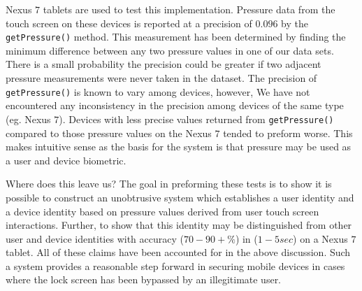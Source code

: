 Nexus $7$ tablets are used to test this implementation.
Pressure data from the touch screen on these devices is 
reported at a precision of $0.096$ by the {\tt getPressure()} method.
This measurement has been determined
by finding the minimum difference between
any two pressure values in one of our data sets.
%
There is a small probability the precision could
be greater if two adjacent pressure measurements
were never taken in the dataset.
%
The precision of {\tt getPressure()} is
known to vary among devices, however,
We have not encountered any inconsistency
in the precision among devices of the same type (eg. Nexus $7$).
%
Devices with less precise values returned from
{\tt getPressure()}
compared to those pressure values on the Nexus $7$
tended to preform worse.
%
This makes intuitive sense as the basis for the system
is that pressure may be used as a user and device biometric.

Where does this leave us?
The goal in preforming these tests is to show it is possible to construct
an 
%
unobtrusive system which 
establishes a user identity 
and a device identity
based on pressure values 
derived from user touch screen interactions.
%
Further, to show that this identity may be 
distinguished from other 
user and device identities with accuracy ($70-90+\%$)
in ($1-5 sec$) on a Nexus $7$ tablet.
%
All of these claims have been accounted for
in the above discussion.
%
Such a system provides a reasonable step forward in
securing mobile devices in cases where the lock screen has
been bypassed by an illegitimate user.